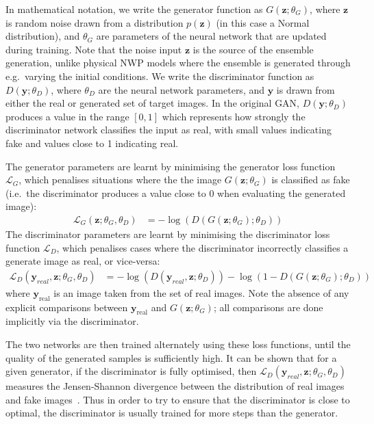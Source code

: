 \documentclass[../main.tex]{subfiles}
\begin{document}

In mathematical notation, we write the generator function as $G(\mathbf{z};\theta_G)$, where $\mathbf{z}$ is random noise drawn from a distribution $p(\mathbf{z})$ (in this case a Normal distribution), and $\theta_G$ are parameters of the neural network that are updated during training. Note that the noise input $\mathbf{z}$ is the source of the ensemble generation, unlike physical NWP models where the ensemble is generated through e.g.~varying the initial conditions. We write the discriminator function as $D(\mathbf{y};\theta_D)$, where $\theta_D$ are the neural network parameters, and $\mathbf{y}$ is drawn from either the real or generated set of target images. In the original GAN, $D(\mathbf{y};\theta_D)$ produces a value in the range $[0,1]$ which represents how strongly the discriminator network classifies the input as real, with small values indicating fake and values close to 1 indicating real. 

The generator parameters are learnt by minimising the generator loss function $\mathcal{L}_G$, which penalises situations where the the image $G(\mathbf{z}; \theta_G)$ is classified as fake (i.e.~the discriminator produces a value close to 0 when evaluating the generated image):
\begin{align}
    \mathcal{L}_G(\mathbf{z}; \theta_G, \theta_D) &= -\log ( D(G(\mathbf{z}; \theta_G); \theta_D))
\end{align}
The discriminator parameters are learnt by minimising the discriminator loss function $\mathcal{L}_D$, which penalises cases where the discriminator incorrectly classifies a generate image as real, or vice-versa:
\begin{align}
\mathcal{L}_D(\mathbf{y}_{real}, \mathbf{z}; \theta_G, \theta_D) &= -\log(D(\mathbf{y}_{real}, \mathbf{z} ; \theta_D)) - \log ( 1 - D(G(\mathbf{z};\theta_G); \theta_D))
\end{align}
where $\mathbf{y}_{\text{real}}$ is an image taken from the set of real images. Note the absence of any explicit comparisons between $\mathbf{y}_{\text{real}}$ and $G(\mathbf{z}; \theta_G)$; all comparisons are done implicitly via the discriminator. 

The two networks are then trained alternately using these loss functions, until the quality of the generated samples is sufficiently high. It can be shown that for a given generator, if the discriminator is fully optimised, then $\mathcal{L}_D(\mathbf{y}_{real}, \mathbf{z}; \theta_G, \theta_D)$ measures the Jensen-Shannon divergence between the distribution of real images and fake images~\citep{goodfellow_generative_2014}. Thus in order to try to ensure that the discriminator is close to optimal, the discriminator is usually trained for more steps than the generator.
\end{document}
